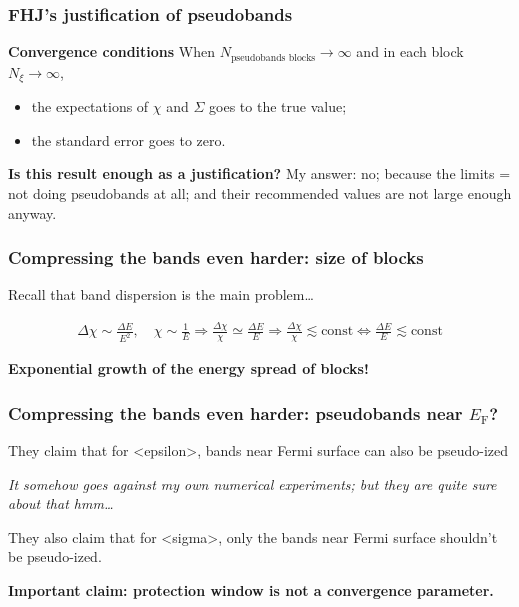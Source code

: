 \documentclass[t,aspectratio=169]{beamer}
\newcommand{\shortcode}[1]{\texttt{#1}}
\newcommand*{\const}{\text{const}}
\def\\{}%
\def\texttt#1{<#1>}%
\begin{document}
\begin{frame}
\frametitle{FHJ's justification of pseudobands}

\textbf{Convergence conditions} When $N_{\text{pseudobands blocks}} \to \infty$ and in each block $N_\xi \to \infty$, 
\begin{itemize}
    \item the expectations of $\chi$ and $\Sigma$ goes to the true value;
    \item the standard error goes to zero.
\end{itemize}

\textbf{Is this result enough as a justification?} My answer: no; 
because the limits = not doing pseudobands at all;
and their recommended values are not large enough anyway.


\end{frame}

\begin{frame}
\frametitle{Compressing the bands even harder: size of blocks}

Recall that band dispersion is the main problem\dots

\[
    \begin{aligned}
        \Delta \chi \sim \frac{\Delta E}{E^2}, \quad \chi \sim \frac{1}{E} \Rightarrow
        \frac{\Delta \chi}{\chi} \simeq \frac{\Delta E}{E} \\
        \Rightarrow
        \frac{\Delta \chi}{\chi} \lesssim \const \Leftrightarrow \boxed{\frac{\Delta E}{E} \lesssim \const}
    \end{aligned}
\]

\textbf{Exponential growth of the energy spread of blocks!}

\end{frame}

\begin{frame}
\frametitle{Compressing the bands even harder: pseudobands near $E_{\text{F}}$?}

They claim that for \shortcode{epsilon}, 
bands near Fermi surface can also be pseudo-ized 

\emph{It somehow goes against my own numerical experiments; but they are quite sure about that hmm\dots}

They also claim that for \shortcode{sigma}, only the bands near Fermi surface shouldn't be pseudo-ized.

\textbf{Important claim: protection window is not a convergence parameter.} 

\end{frame}
\end{document}
